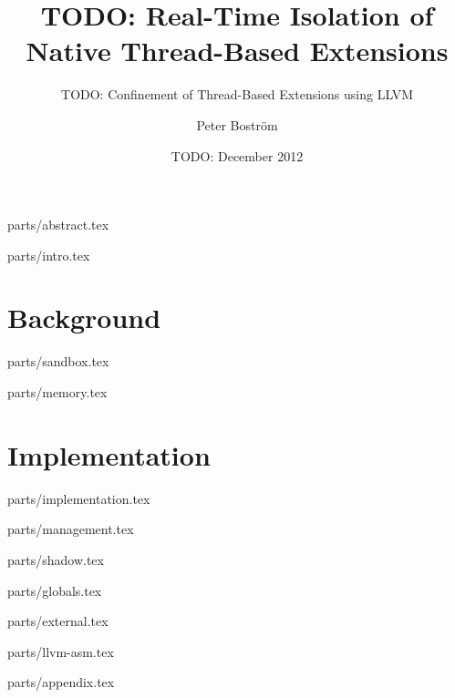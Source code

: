 \documentclass[a4paper,11pt]{xjobb/kth-mag}
\title {TODO: Real-Time Isolation of Native Thread-Based Extensions}
\subtitle {TODO: Confinement of Thread-Based Extensions using LLVM}
\author {Peter Boström}
\date {TODO: December 2012}
\begin{document}
\frontmatter
\pagestyle {empty}
\removepagenumbers
\maketitle
{}

 {parts/abstract.tex}

\clearpage
\tableofcontents*
\mainmatter
\pagestyle {newchap}

 {parts/intro.tex}

\part {Background}

 {parts/sandbox.tex}

 {parts/memory.tex}

\part {Implementation}

 {parts/implementation.tex}

 {parts/management.tex}

 {parts/shadow.tex}

 {parts/globals.tex}

 {parts/external.tex}

 {parts/llvm-asm.tex}

\appendix
\addappheadtotoc

 {parts/appendix.tex}
\end{document}
